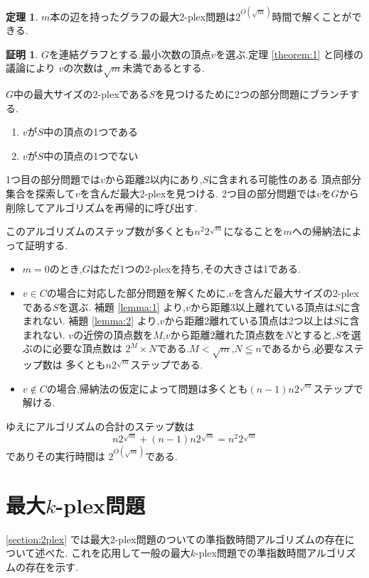 \documentclass{thesis}
\theoremstyle{definition}
\newtheorem{theorem}{定理}[chapter]
\newtheorem*{prf*}{証明}
\begin{document}
\begin{theorem} \label{theorem:2}
$m$本の辺を持ったグラフの最大2-plex問題は$2^{O(\sqrt{m})}$時間で解くことができる.
\begin{prf*}
$G$を連結グラフとする.最小次数の頂点$v$を選ぶ.定理 \ref{theorem:1} と同様の議論により
$v$の次数は$\sqrt{m}$未満であるとする.

$G$中の最大サイズの2-plexである$S$を見つけるために2つの部分問題にブランチする.
\begin{enumerate}
 \item $v$が$S$中の頂点の1つである
 \item $v$が$S$中の頂点の1つでない
\end{enumerate}
1つ目の部分問題では$v$から距離2以内にあり,$S$に含まれる可能性のある
頂点部分集合を探索して$v$を含んだ最大2-plexを見つける.
2つ目の部分問題では$v$を$G$から削除してアルゴリズムを再帰的に呼び出す.

このアルゴリズムのステップ数が多くとも$n^{2}2^{\sqrt{m}}$になることを$m$への帰納法によって証明する.
\begin{itemize}
 \item $m = 0$のとき,$G$はただ1つの2-plexを持ち,その大きさは1である.	
 \item $v \in C$の場合に対応した部分問題を解くために,$v$を含んだ最大サイズの2-plexである$S$を選ぶ.
補題  \ref{lemma:1} より,$v$から距離3以上離れている頂点は$S$に含まれない.
補題  \ref{lemma:2} より,$v$から距離2離れている頂点は2つ以上は$S$に含まれない.
$v$の近傍の頂点数を$M$,$v$から距離2離れた頂点数を$N$とすると,$S$を選ぶのに必要な頂点数は %
$2^{M} \times N$である.$M < \sqrt{m}$,$N \leqq n$であるから,必要なステップ数は
多くとも$n2^{\sqrt{m}}$ステップである.
 \item $v \notin C$の場合,帰納法の仮定によって問題は多くとも$(n - 1)n2^{\sqrt{m}}$ステップで解ける.
\end{itemize}
ゆえにアルゴリズムの合計のステップ数は
\[  n2^{\sqrt{m}} +  (n - 1)n2^{\sqrt{m}} = n^{2}2^{\sqrt{m}} \]
でありその実行時間は $2^{O(\sqrt{m})}$である.
\end{prf*}
\end{theorem}

\section{最大$k$-plex問題} \label{section:kplex}
 \ref{section:2plex} では最大2-plex問題のついての準指数時間アルゴリズムの存在について述べた.
これを応用して一般の最大$k$-plex問題での準指数時間アルゴリズムの存在を示す.
\end{document}

